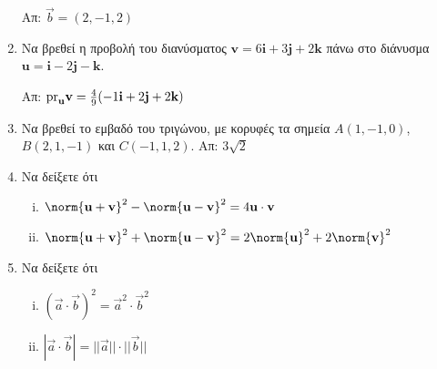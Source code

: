 \begin{enumerate}[itemsep=0.7\baselineskip]
    \hfill Απ: $ \vec{b}=(2,-1,2) $

  \item Να βρεθεί η προβολή του διανύσματος $ \mathbf{v} = 6 \mathbf{i}+3 \mathbf{j} + 2
    \mathbf{k} $ πάνω στο διάνυσμα $ \mathbf{u} = \mathbf{i}-2 \mathbf{j} - \mathbf{k} $.

    \hfill Απ: $ \rm{pr}_{\mathbf{u}}{\mathbf{v}} = \frac{4}{9} (-1 \mathbf{i}+2
    \mathbf{j}+2 \mathbf{k}) $ 

  \item Να βρεθεί το εμβαδό του τριγώνου, με κορυφές τα σημεία $ A(1,-1,0) $, 
    $ B(2,1,-1) $ και $ C(-1,1,2) $. 
    \hfill Απ: $ 3 \sqrt{2} $ 


  \item Να δείξετε ότι 
    \begin{enumerate}[(i)]
      \item $ \norm{\mathbf{u}+ \mathbf{v}}^{2} - \norm{\mathbf{u}- \mathbf{v}}^{2} 
        = 4 \mathbf{u}\cdot \mathbf{v} $
      \item $ \norm{\mathbf{u}+ \mathbf{v}}^{2} + \norm{\mathbf{u}- \mathbf{v}}^{2} 
        = 2 \norm{\mathbf{u}} ^{2} + 2 \norm{\mathbf{v}} ^{2} $
    \end{enumerate}

  \item Να δείξετε ότι 
    \begin{enumerate}[(i)]
      \item $(\vec{a}\cdot \vec{b})^{2} = \vec{a}^{2}\cdot \vec{b}^{2}$
      \item $|\vec{a}\cdot \vec{b}| = ||\vec{a}|| \cdot ||\vec{b}||$
    \end{enumerate}


\end{enumerate}
